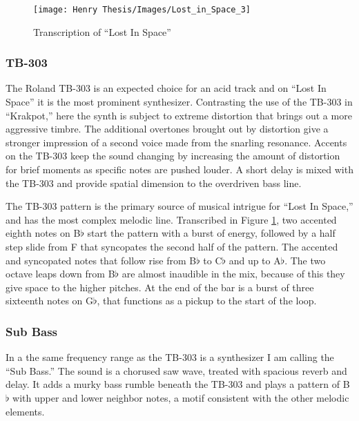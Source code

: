 \documentclass[12pt,twoside]{reedthesis}
\begin{document}
\begin{figure}
\begin{centering} 
\texttt{[image: Henry Thesis/Images/Lost\_in\_Space\_3]}
\caption{Transcription of ``Lost In Space''}
\label{fig:lostinspace}
\end{centering} 
\end{figure}

\subsubsection{TB-303}

The Roland TB-303 is an expected choice for an acid track and on ``Lost In Space'' it is the most prominent synthesizer. Contrasting the use of the TB-303 in ``Krakpot,'' here the synth is subject to extreme distortion that brings out a more aggressive timbre. The additional overtones brought out by distortion give a stronger impression of a second voice made from the snarling resonance. Accents on the TB-303 keep the sound changing by increasing the amount of distortion for brief moments as specific notes are pushed louder. A short delay is mixed with the TB-303 and provide spatial dimension to the overdriven bass line.

The TB-303 pattern is the primary source of musical intrigue for ``Lost In Space,'' and has the most complex melodic line. Transcribed in Figure \ref{fig:lostinspace}, two accented eighth notes on B$\flat$ start the pattern with a burst of energy, followed by a half step slide from F that syncopates the second half of the pattern. The accented and syncopated notes that follow rise from B$\flat$ to C$\flat$ and up to A$\flat$. The two octave leaps down from B$\flat$ are almost inaudible in the mix, because of this they give space to the higher pitches. At the end of the bar is a burst of three sixteenth notes on G$\flat$, that functions as a pickup to the start of the loop.

\subsubsection{Sub Bass}

In a the same frequency range as the TB-303 is a synthesizer I am calling the ``Sub Bass.'' The sound is a chorused saw wave, treated with spacious reverb and delay. It adds a murky bass rumble beneath the TB-303 and plays a pattern of B$\flat$ with upper and lower neighbor notes, a motif consistent with the other melodic elements.
\end{document}
